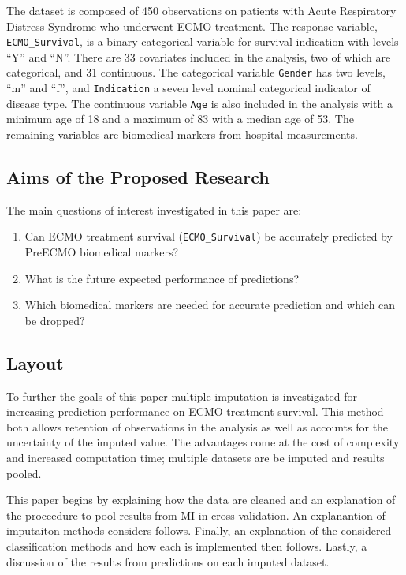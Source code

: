 \documentclass[12pt,]{article}
\providecommand{\tightlist}{%
  \setlength{\itemsep}{0pt}\setlength{\parskip}{0pt}}
\begin{document}
The dataset is composed of 450 observations on patients with Acute
Respiratory Distress Syndrome who underwent ECMO treatment. The response
variable, \texttt{ECMO\_Survival}, is a binary categorical variable for
survival indication with levels ``Y'' and ``N''. There are 33 covariates
included in the analysis, two of which are categorical, and 31
continuous. The categorical variable \texttt{Gender} has two levels,
``m'' and ``f'', and \texttt{Indication} a seven level nominal
categorical indicator of disease type. The continuous variable
\texttt{Age} is also included in the analysis with a minimum age of 18
and a maximum of 83 with a median age of 53. The remaining variables are
biomedical markers from hospital measurements.

\subsection{Aims of the Proposed
Research}\label{aims-of-the-proposed-research}

The main questions of interest investigated in this paper are:

\begin{enumerate}
\def\labelenumi{\arabic{enumi}.}
\tightlist
\item
  Can ECMO treatment survival (\texttt{ECMO\_Survival}) be accurately
  predicted by PreECMO biomedical markers?
\item
  What is the future expected performance of predictions?
\item
  Which biomedical markers are needed for accurate prediction and which
  can be dropped?
\end{enumerate}

\subsection{Layout}\label{layout}

To further the goals of this paper multiple imputation is investigated
for increasing prediction performance on ECMO treatment survival. This
method both allows retention of observations in the analysis as well as
accounts for the uncertainty of the imputed value. The advantages come
at the cost of complexity and increased computation time; multiple
datasets are be imputed and results pooled.

This paper begins by explaining how the data are cleaned and an
explanation of the proceedure to pool results from MI in
cross-validation. An explanantion of imputaiton methods considers
follows. Finally, an explanation of the considered classification
methods and how each is implemented then follows. Lastly, a discussion
of the results from predictions on each imputed dataset.
\end{document}
